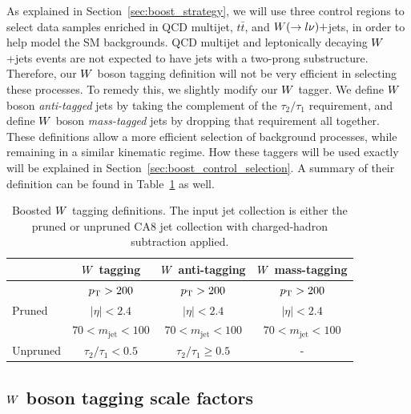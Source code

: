 As explained in Section~\ref{sec:boost_strategy}, we will use three control regions to select data
samples enriched in QCD multijet, $t\bar{t}$, and $W(\rightarrow l \nu)+$jets, in order to help
model the SM backgrounds. QCD multijet and leptonically decaying $W$+jets events are not expected
to have jets with a two-prong substructure. Therefore, our $W$ boson tagging definition will not be
very efficient in selecting these processes. To remedy this, we slightly modify our $W$ tagger. 
We define $W$ boson \textit{anti-tagged} jets by taking the complement of the $\tau_2 / \tau_1$
requirement, and define $W$ boson \textit{mass-tagged} jets by dropping that requirement all
together. 
These definitions allow a more efficient selection of background processes, while remaining in a
similar kinematic regime. How these taggers will be used exactly will be explained in
Section~\ref{sec:boost_control_selection}. A summary of their definition can be found in
Table~\ref{tab:Wtag_definition} as well. 

\begin{table}[htdp]
\caption{Boosted $W$ tagging definitions. The input jet collection is either the pruned or unpruned
CA8 jet collection with charged-hadron subtraction applied. }
\vspace{1ex}
\centering
\begin{tabular}{l c c c}
\toprule
& $W$ tagging & $W$ anti-tagging & $W$ mass-tagging  \\
\midrule
\multirow{3}{*}{Pruned} & $p_{\mathrm{T}} > 200$  & $p_{\mathrm{T}} > 200$  & $p_{\mathrm{T}} > 200$\\
& $|\eta| < 2.4$ & $|\eta| < 2.4$ & $|\eta| < 2.4$\\
& $70 < m_{\textrm{jet}}< 100$ & $70 < m_{\textrm{jet}}< 100$ & $70 < m_{\textrm{jet}}< 100$\\
\midrule
Unpruned & $\tau_2 / \tau_1 < 0.5$ & $\tau_2 / \tau_1 \geq 0.5$ & -\\
\bottomrule
\end{tabular}
\label{tab:Wtag_definition}
\end{table}


\subsection{\texorpdfstring{$W$}{W} boson tagging scale factors \label{sec:wtag_scale_factor}}

